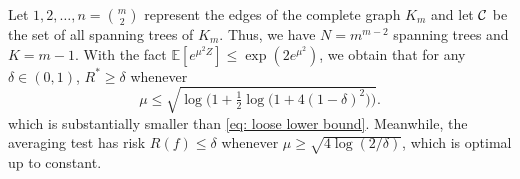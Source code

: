 \documentclass[10pt, oneside]{article}
\begin{document}
\begin{exmp}
  \label{exmp:Spanning Trees}
Let $1,2,\ldots,n={m\choose2}$ represent the edges of the complete graph $K_m$ and let ${\mathcal C}$ be the set of all spanning trees of $K_m$.
Thus, we have $N=m^{m-2}$ spanning trees and $K=m-1$. With the fact $\mathbb{E}[ e^{\mu^2 Z} ] \le \exp(2e^{\mu^2 })$, we obtain that for any $\delta\in(0,1)$,
$R^* \ge\delta$ whenever
\[
\mu\le\sqrt{\log\bigl(1+\tfrac1 2 \log\bigl(1+4(1-\delta)^2\bigr) \bigr)}.
\]
which is substantially smaller than \ref{eq: loose lower bound}. Meanwhile, the averaging test has risk $R(f) \le\delta$ whenever $\mu\ge\sqrt{4\log(2/\delta)}$, which is optimal up to constant.
\end{exmp}

\end{document}
